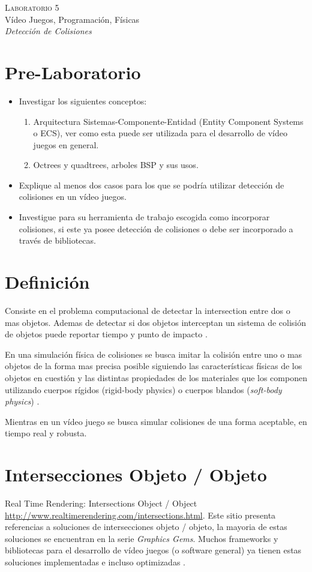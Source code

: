 \begin{center}
\textsc{\Large Laboratorio 5}~\\
{\large Vídeo Juegos, Programación, Físicas}~\\
\emph{Detección de Colisiones}
\end{center}


\section{Pre-Laboratorio}
\begin{itemize}
\item Investigar los siguientes conceptos:
\begin{enumerate}
  \item Arquitectura Sistemas-Componente-Entidad (Entity Component Systems o ECS), ver como esta puede ser utilizada para el desarrollo de vídeo juegos en general.
  \item Octrees y quadtrees, arboles BSP y sus usos.
\end{enumerate}
\item Explique al menos dos casos para los que se podría utilizar detección de colisiones en un vídeo juegos.
\item Investigue para su herramienta de trabajo escogida como incorporar colisiones, si este ya posee detección de colisiones o debe ser incorporado a través de bibliotecas.
\end{itemize}

\section{Definición}
Consiste en el problema computacional de detectar la intersection entre dos o mas objetos. Ademas de detectar si dos objetos interceptan un sistema de colisión de objetos puede reportar tiempo y punto de impacto \cite{ericson_collision}.

En una simulación física de colisiones se busca imitar la colisión entre uno o mas objetos de la forma mas precisa posible siguiendo las características físicas de los objetos en cuestión y las distintas propiedades de los materiales que los componen utilizando cuerpos rígidos (rigid-body physics) o cuerpos blandos (\emph{soft-body physics}) \cite[p.~340]{jenkinscreatinggames}.

Mientras en un vídeo juego se busca simular colisiones de una forma aceptable, en tiempo real y robusta.

\section{Intersecciones Objeto / Objeto}
Real Time Rendering: Intersections Object / Object \url{http://www.realtimerendering.com/intersections.html}. Este sitio presenta referencias a soluciones de intersecciones objeto / objeto, la mayoria de estas soluciones se encuentran en la serie \emph{Graphics Gems}. Muchos frameworks y bibliotecas para el desarrollo de vídeo juegos (o software general) ya tienen estas soluciones implementadas e incluso optimizadas \cite{rtr_intersections}.
